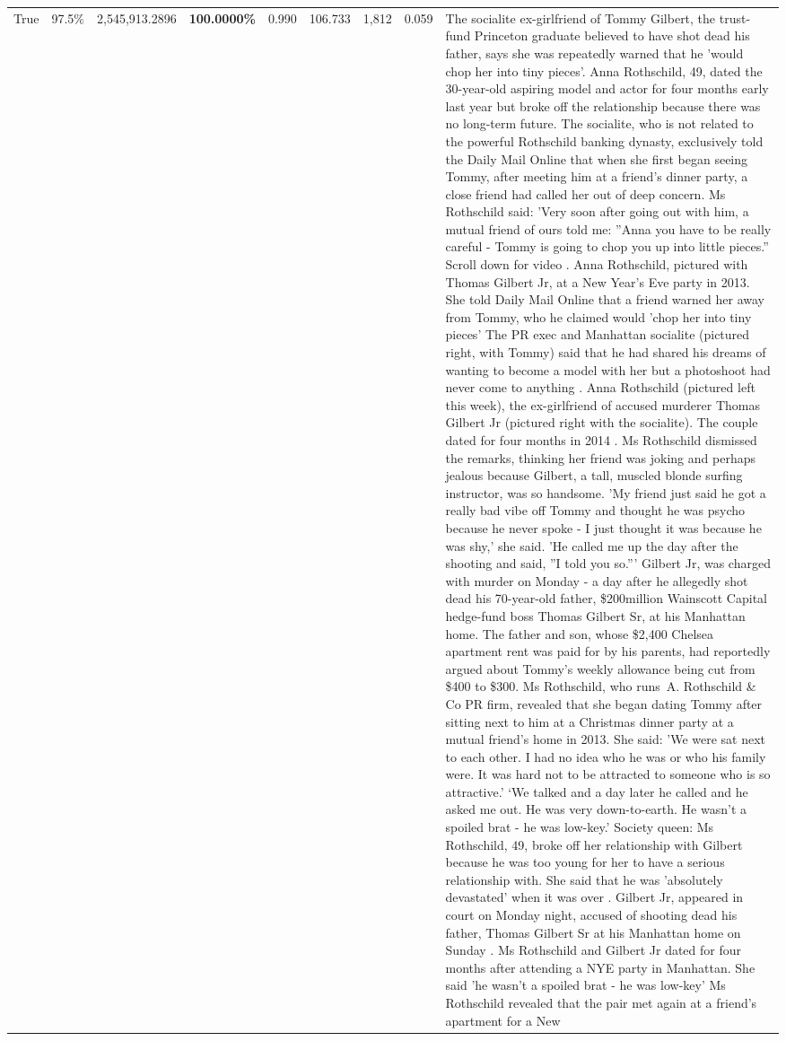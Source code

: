 \begin{table}[H]
\begin{tabular}{lllrlllll}
True & 97.5\% & 2,545,913.2896 & \bfseries \color{red} 100.0000\% & 0.990 & 106.733 & 1,812 & 0.059 & The socialite ex-girlfriend of Tommy Gilbert, the trust-fund Princeton graduate believed to have shot dead his father, says she was repeatedly warned that he 'would chop her into tiny pieces'. Anna Rothschild, 49, dated the 30-year-old aspiring model and actor for four months early last year but broke off the relationship because there was no long-term future. The socialite, who is not related to the powerful Rothschild banking dynasty, exclusively told the Daily Mail Online that when she first began seeing Tommy, after meeting him at a friend's dinner party, a close friend had called her out of deep concern. Ms Rothschild said: 'Very soon after going out with him, a mutual friend of ours told me: ''Anna you have to be really careful - Tommy is going to chop you up into little pieces.'' Scroll down for video . Anna Rothschild, pictured with Thomas Gilbert Jr, at a New Year's Eve party in 2013. She told Daily Mail Online that a friend warned her away from Tommy, who he claimed would 'chop her into tiny pieces' The PR exec and Manhattan socialite (pictured right, with Tommy) said that he had shared his dreams of wanting to become a model with her but a photoshoot had never come to anything . Anna Rothschild (pictured left this week), the ex-girlfriend of accused murderer Thomas Gilbert Jr (pictured right with the socialite). The couple dated for four months in 2014 . Ms Rothschild dismissed the remarks, thinking her friend was joking and perhaps jealous because Gilbert, a tall, muscled blonde surfing instructor, was so handsome. 'My friend just said he got a really bad vibe off Tommy and thought he was psycho because he never spoke - I just thought it was because he was shy,' she said. 'He called me up the day after the shooting and said, ''I told you so.''' Gilbert Jr, was charged with murder on Monday - a day after he allegedly shot dead his 70-year-old father, \$200million Wainscott Capital hedge-fund boss Thomas Gilbert Sr, at his Manhattan home. The father and son, whose \$2,400 Chelsea apartment rent was paid for by his parents, had reportedly argued about Tommy's weekly allowance being cut from \$400 to \$300. Ms Rothschild, who runs A. Rothschild \& Co PR firm, revealed that she began dating Tommy after sitting next to him at a Christmas dinner party at a mutual friend's home in 2013. She said: 'We were sat next to each other. I had no idea who he was or who his family were. It was hard not to be attracted to someone who is so attractive.' ‘We talked and a day later he called and he asked me out. He was very down-to-earth. He wasn’t a spoiled brat - he was low-key.’ Society queen: Ms Rothschild, 49, broke off her relationship with Gilbert because he was too young for her to have a serious relationship with. She said that he was 'absolutely devastated' when it was over . Gilbert Jr, appeared in court on Monday night, accused of shooting dead his father, Thomas Gilbert Sr at his Manhattan home on Sunday . Ms Rothschild and Gilbert Jr dated for four months after attending a NYE party in Manhattan. She said 'he wasn't a spoiled brat - he was low-key' Ms Rothschild revealed that the pair met again at a friend’s apartment for a New 
\end{tabular}
\end{table}
